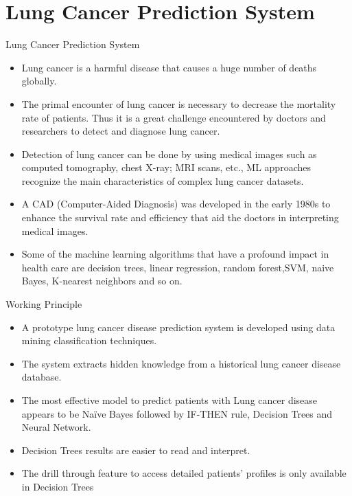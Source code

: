 \documentclass{SKP-beamer}
\begin{document}
\section{\textbf{Lung Cancer Prediction System}}

\begin{frame}{Lung Cancer Prediction System}
\begin{itemize}
	\item Lung cancer is a harmful disease that causes a huge number of
	deaths globally. 
	\item The primal encounter of lung cancer is necessary to decrease the mortality rate of patients. Thus it is a great challenge encountered by doctors and researchers to
	detect and diagnose lung cancer. 
	\item Detection of lung cancer can be done by using medical images such as computed tomography, chest X-ray; MRI scans, etc., ML approaches recognize the main characteristics of complex lung cancer
	datasets. 
	\item A CAD (Computer-Aided Diagnosis) was developed in the early 1980s to enhance the survival rate and efficiency that aid the doctors in interpreting medical images. 
	\item Some of the machine learning algorithms that have a profound impact in health care are decision trees, linear regression, random forest,SVM, naive Bayes, K-nearest neighbors and so on.
\end{itemize}
\end{frame}


\begin{frame}{Working Principle}
	\begin{itemize}
		\item A prototype lung cancer disease prediction system is
		developed using data mining classification techniques. 
		\item The system extracts hidden knowledge from a historical lung
		cancer disease database. 
		\item The most effective model to predict patients with Lung cancer disease appears to be
		Naïve Bayes followed by IF-THEN rule, Decision Trees and Neural Network.
		\item Decision Trees results are easier to read and interpret. 
		\item The drill through feature to access detailed patients’ profiles is only available in Decision Trees	
	\end{itemize}
\end{frame}
\end{document}
